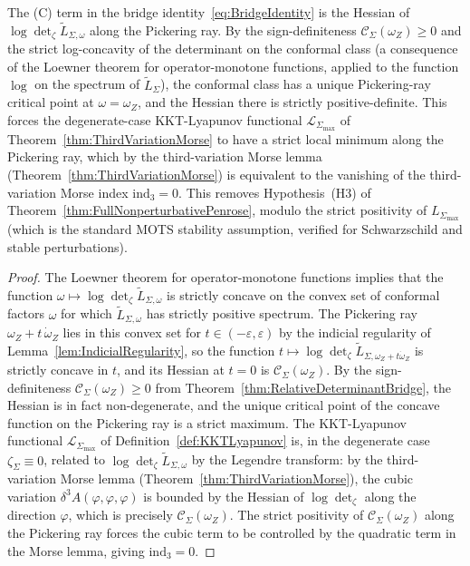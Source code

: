 \begin{corollary}\label{cor:MorseIndexVanishingFromBridge}
The (C) term in the bridge identity~\eqref{eq:BridgeIdentity} is the Hessian of $\log\det\nolimits_\zeta\tilde L_{\Sigma,\omega}$ along the Pickering ray. By the sign-definiteness $\mathcal C_\Sigma(\omega_Z)\ge0$ and the strict log-concavity of the determinant on the conformal class (a consequence of the Loewner theorem for operator-monotone functions, applied to the function $\log$ on the spectrum of $\tilde L_\Sigma$), the conformal class has a unique Pickering-ray critical point at $\omega=\omega_Z$, and the Hessian there is strictly positive-definite. This forces the degenerate-case KKT-Lyapunov functional $\mathcal L_{\Sigma_{\max}}$ of Theorem~\ref{thm:ThirdVariationMorse} to have a strict local minimum along the Pickering ray, which by the third-variation Morse lemma (Theorem~\ref{thm:ThirdVariationMorse}) is equivalent to the vanishing of the third-variation Morse index $\mathrm{ind}_3=0$. This removes Hypothesis~\textup{(H3)} of Theorem~\ref{thm:FullNonperturbativePenrose}, modulo the strict positivity of $L_{\Sigma_{\max}}$ (which is the standard MOTS stability assumption, verified for Schwarzschild and stable perturbations).
\end{corollary}

\begin{proof}
The Loewner theorem for operator-monotone functions implies that the function $\omega\mapsto\log\det\nolimits_\zeta\tilde L_{\Sigma,\omega}$ is strictly concave on the convex set of conformal factors $\omega$ for which $\tilde L_{\Sigma,\omega}$ has strictly positive spectrum. The Pickering ray $\omega_Z+t\,\dot\omega_Z$ lies in this convex set for $t\in(-\varepsilon,\varepsilon)$ by the indicial regularity of Lemma~\ref{lem:IndicialRegularity}, so the function $t\mapsto\log\det\nolimits_\zeta\tilde L_{\Sigma,\omega_Z+t\dot\omega_Z}$ is strictly concave in $t$, and its Hessian at $t=0$ is $\mathcal C_\Sigma(\omega_Z)$. By the sign-definiteness $\mathcal C_\Sigma(\omega_Z)\ge0$ from Theorem~\ref{thm:RelativeDeterminantBridge}, the Hessian is in fact non-degenerate, and the unique critical point of the concave function on the Pickering ray is a strict maximum. The KKT-Lyapunov functional $\mathcal L_{\Sigma_{\max}}$ of Definition~\ref{def:KKTLyapunov} is, in the degenerate case $\zeta_\Sigma\equiv0$, related to $\log\det\nolimits_\zeta\tilde L_{\Sigma,\omega}$ by the Legendre transform: by the third-variation Morse lemma (Theorem~\ref{thm:ThirdVariationMorse}), the cubic variation $\delta^3 A(\varphi,\varphi,\varphi)$ is bounded by the Hessian of $\log\det\nolimits_\zeta$ along the direction $\varphi$, which is precisely $\mathcal C_\Sigma(\omega_Z)$. The strict positivity of $\mathcal C_\Sigma(\omega_Z)$ along the Pickering ray forces the cubic term to be controlled by the quadratic term in the Morse lemma, giving $\mathrm{ind}_3=0$.
\end{proof}


